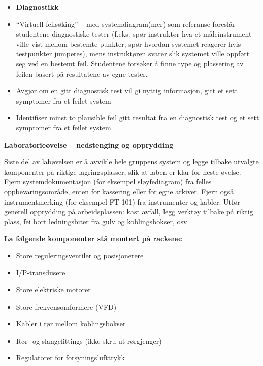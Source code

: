 \begin{itemize}
\item{} {\bf Diagnostikk}
\item{} ``Virtuell feilsøking'' -- med systemdiagram(mer) som referanse foreslår studentene diagnostiske tester (f.eks. spør instruktør hva et måleinstrument ville vist mellom bestemte punkter; spør hvordan systemet reagerer hvis testpunkter jumperes), mens instruktøren svarer slik systemet ville oppført seg ved en bestemt feil. Studentene forsøker å finne type og plassering av feilen basert på resultatene av egne tester.
\item{} Avgjør om en gitt diagnostisk test vil gi nyttig informasjon, gitt et sett symptomer fra et feilet system
\item{} Identifiser minst to plausible feil gitt resultat fra en diagnostisk test og et sett symptomer fra et feilet system
\end{itemize}



\vfil \eject

\noindent
{\bf Laboratorieøvelse -- nedstenging og opprydding}

\vskip 5pt

Siste del av labøvelsen er å avvikle hele gruppens system og legge tilbake utvalgte komponenter på riktige lagringsplasser, slik at laben er klar for neste øvelse. Fjern systemdokumentasjon (for eksempel sløyfediagram) fra felles oppbevaringsområde, enten for kassering eller for egne arkiver. Fjern også instrumentmerking (for eksempel FT-101) fra instrumenter og kabler. Utfør generell opprydding på arbeidsplassen: kast avfall, legg verktøy tilbake på riktig plass, fei bort ledningsbiter fra gulv og koblingsbokser, osv.

\vskip 10pt

\indent
{\bf La følgende komponenter stå montert på rackene:}

\begin{itemize}
\item{} Store reguleringsventiler og posisjonerere
\item{} I/P-transdusere
\item{} Store elektriske motorer
\item{} Store frekvensomformere (VFD)
\item{} Kabler i rør mellom koblingsbokser
\item{} Rør- og slangefittings (ikke skru ut rørgjenger)
\item{} Regulatorer for forsyningslufttrykk
\end{itemize}

